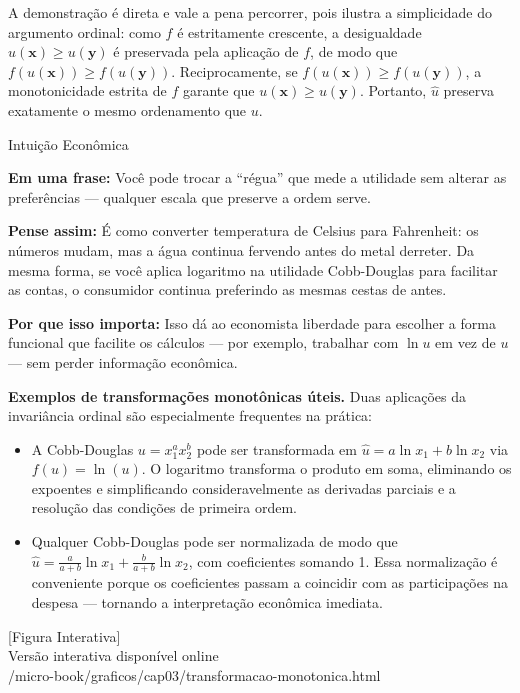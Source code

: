 \documentclass[11pt,twoside,openright]{book}
\newcommand{\figurePlaceholder}[1]{%
  \begin{center}
    \begin{tcolorbox}[
      width=0.85\textwidth,
      colback=graybg,
      colframe=gray,
      boxrule=0.5pt,
      arc=2pt,
      halign=center,
      valign=center,
      height=5cm
    ]
      \centering
      \vfill
      {\sffamily\color{gray}\large [Figura Interativa]}\\[6pt]
      {\sffamily\small\color{gray} Versão interativa disponível online}\\[4pt]
      {\ttfamily\tiny\color{gray} #1}
      \vfill
    \end{tcolorbox}
  \end{center}
}
\providecommand{\tightlist}{\setlength{\itemsep}{0pt}\setlength{\parskip}{0pt}}
\begin{document}
A demonstração é direta e vale a pena percorrer, pois ilustra a
simplicidade do argumento ordinal: como \(f\) é estritamente crescente,
a desigualdade \(u(\mathbf{x}) \geq u(\mathbf{y})\) é preservada pela
aplicação de \(f\), de modo que
\(f(u(\mathbf{x})) \geq f(u(\mathbf{y}))\). Reciprocamente, se
\(f(u(\mathbf{x})) \geq f(u(\mathbf{y}))\), a monotonicidade estrita de
\(f\) garante que \(u(\mathbf{x}) \geq u(\mathbf{y})\). Portanto,
\(\hat{u}\) preserva exatamente o mesmo ordenamento que \(u\).

\begin{intuitionbox}{Intuição Econômica}

\textbf{Em uma frase:} Você pode trocar a ``régua'' que mede a utilidade
sem alterar as preferências --- qualquer escala que preserve a ordem
serve.

\textbf{Pense assim:} É como converter temperatura de Celsius para
Fahrenheit: os números mudam, mas a água continua fervendo antes do
metal derreter. Da mesma forma, se você aplica logaritmo na utilidade
Cobb-Douglas para facilitar as contas, o consumidor continua preferindo
as mesmas cestas de antes.

\textbf{Por que isso importa:} Isso dá ao economista liberdade para
escolher a forma funcional que facilite os cálculos --- por exemplo,
trabalhar com \(\ln u\) em vez de \(u\) --- sem perder informação
econômica.

\end{intuitionbox}

\textbf{Exemplos de transformações monotônicas úteis.} Duas aplicações
da invariância ordinal são especialmente frequentes na prática:

\begin{itemize}
\tightlist
\item
  A Cobb-Douglas \(u = x_1^a x_2^b\) pode ser transformada em
  \(\hat{u} = a \ln x_1 + b \ln x_2\) via \(f(u) = \ln(u)\). O logaritmo
  transforma o produto em soma, eliminando os expoentes e simplificando
  consideravelmente as derivadas parciais e a resolução das condições de
  primeira ordem.
\item
  Qualquer Cobb-Douglas pode ser normalizada de modo que
  \(\hat{u} = \frac{a}{a+b} \ln x_1 + \frac{b}{a+b} \ln x_2\), com
  coeficientes somando 1. Essa normalização é conveniente porque os
  coeficientes passam a coincidir com as participações na despesa ---
  tornando a interpretação econômica imediata.
\end{itemize}

\figurePlaceholder{/micro-book/graficos/cap03/transformacao-monotonica.html}
\end{document}
